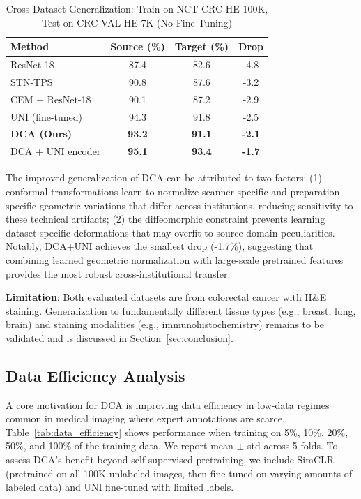 \documentclass[final,3p,times,review,sort&compress]{elsarticle}
\begin{document}
\begin{table}[t]
\centering
\caption{Cross-Dataset Generalization: Train on NCT-CRC-HE-100K, Test on CRC-VAL-HE-7K (No Fine-Tuning)}
\label{tab:generalization}
\begin{tabularx}{\textwidth}{Xccc}
\hline
\textbf{Method} & \textbf{Source (\%)} & \textbf{Target (\%)} & \textbf{Drop} \\
\hline
ResNet-18 & 87.4 & 82.6 & -4.8 \\
STN-TPS & 90.8 & 87.6 & -3.2 \\
CEM + ResNet-18 & 90.1 & 87.2 & -2.9 \\
UNI (fine-tuned) & 94.3 & 91.8 & -2.5 \\
\textbf{DCA (Ours)} & \textbf{93.2} & \textbf{91.1} & \textbf{-2.1} \\
DCA + UNI encoder & \textbf{95.1} & \textbf{93.4} & \textbf{-1.7} \\
\hline
\end{tabularx}
\end{table}

The improved generalization of DCA can be attributed to two factors: (1) conformal transformations learn to normalize scanner-specific and preparation-specific geometric variations that differ across institutions, reducing sensitivity to these technical artifacts; (2) the diffeomorphic constraint prevents learning dataset-specific deformations that may overfit to source domain peculiarities. Notably, DCA+UNI achieves the smallest drop (-1.7\%), suggesting that combining learned geometric normalization with large-scale pretrained features provides the most robust cross-institutional transfer.

\textbf{Limitation}: Both evaluated datasets are from colorectal cancer with H\&E staining. Generalization to fundamentally different tissue types (e.g., breast, lung, brain) and staining modalities (e.g., immunohistochemistry) remains to be validated and is discussed in Section~\ref{sec:conclusion}.

\subsection{Data Efficiency Analysis}
\label{sec:data_efficiency}

A core motivation for DCA is improving data efficiency in low-data regimes common in medical imaging where expert annotations are scarce. Table~\ref{tab:data_efficiency} shows performance when training on 5\%, 10\%, 20\%, 50\%, and 100\% of the training data. We report mean $\pm$ std across 5 folds. To assess DCA's benefit beyond self-supervised pretraining, we include SimCLR (pretrained on all 100K unlabeled images, then fine-tuned on varying amounts of labeled data) and UNI fine-tuned with limited labels.
\end{document}
